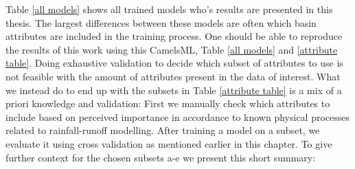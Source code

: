 Table \ref{all models} shows all trained models who's results are presented in this 
thesis. The largest differences between these models are often which basin attributes 
are included in the training process. One should be able to reproduce the results 
of this work using this CamelsML, Table \ref{all models} and \ref{attribute table}. 
Doing exhaustive validation to decide which subset of attributes to use is not 
feasible with the amount of attributes present in the data of interest. What we instead 
do to end up with the subsets in Table \ref{attribute table} is a mix of a priori 
knowledge and validation: First we manually check which attributes to include based 
on perceived importance in accordance to known physical processes related to rainfall-runoff 
modelling. After training a model on a subset, we evaluate it using cross validation 
as mentioned earlier in this chapter. To give further context for the chosen subsets 
a-e we present this short summary:
